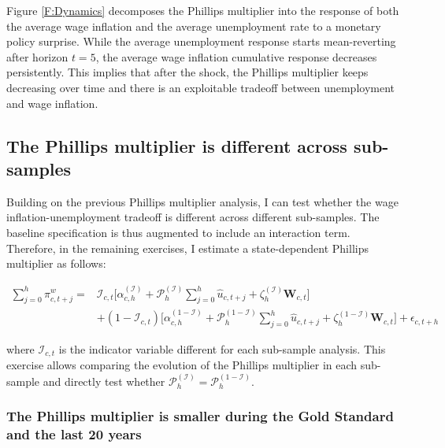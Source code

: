 \documentclass[12pt]{article}
\renewcommand{\vec}[1]{\mathbf{#1}}
\begin{document}
Figure \ref{F:Dynamics} decomposes the Phillips multiplier into the response of both the average wage inflation and the average unemployment rate to a monetary policy surprise. While the average unemployment response starts mean-reverting after horizon $t=5$, the average wage inflation cumulative response decreases persistently. This implies that after the shock, the Phillips multiplier keeps decreasing over time and there is an exploitable tradeoff between unemployment and wage inflation.



\subsection{The Phillips multiplier is different across sub-samples}

Building on the previous Phillips multiplier analysis, I can test whether the wage inflation-unemployment tradeoff is different across different sub-samples. The baseline specification is thus augmented to include an interaction term. Therefore, in the remaining exercises, I estimate a state-dependent Phillips multiplier as follows:

\begin{equation} \label{EQ:MULT_State}
\begin{split}
	\sum_{j=0}^{h} \pi_{c,t+j}^{w} = & \mathcal{I}_{c,t} \Bigg[\alpha_{c,h}^{(\mathcal{I})} + \mathcal{P}^{(\mathcal{I})}_h \sum_{j=0}^{h} \hat{u}_{c,t+j} + \zeta^{(\mathcal{I})}_h \vec{W}_{c,t}\Bigg] \\  
	& + (1 - \mathcal{I}_{c,t}) \Bigg[\alpha_{c,h}^{(1-\mathcal{I})} + \mathcal{P}^{(1-\mathcal{I})}_h \sum_{j=0}^{h} \hat{u}_{c,t+j} + \zeta^{(1-\mathcal{I})}_h \vec{W}_{c,t}\Bigg] +  \epsilon_{c,t+h}
\end{split}
\end{equation}

where $\mathcal{I}_{c,t}$ is the indicator variable different for each sub-sample analysis. This exercise allows comparing the evolution of the Phillips multiplier in each sub-sample and directly test whether $\mathcal{P}_h^{(\mathcal{I})} = \mathcal{P}_h^{(1-\mathcal{I})}$.

\subsubsection{The Phillips multiplier is smaller during the Gold Standard and the last 20 years}
\end{document}
